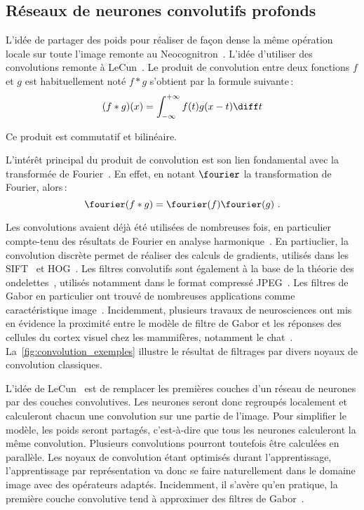\subsection{Réseaux de neurones convolutifs profonds}

L'idée de partager des poids pour réaliser de façon dense la même opération locale sur toute l'image remonte au Neocognitron~\cite{fukushima_neocognitron_1980}. L'idée d'utiliser des convolutions remonte à LeCun~\cite{lecun_gradient-based_1998}. Le produit de convolution entre deux fonctions $f$ et $g$ est habituellement noté $f * g$ s'obtient par la formule suivante\,:
$$(f * g)(x) = \int_{-\infty}^{+\infty} f(t)g(x-t)\diff t$$

Ce produit est commutatif et bilinéaire.

L'intérêt principal du produit de convolution est son lien fondamental avec la transformée de Fourier~\cite{fourier_propagation_1822}. En effet, en notant $\fourier$ la transformation de Fourier, alors\,:
$$\fourier(f \ast g) = \fourier (f)\fourier (g)~.$$


Les convolutions avaient déjà été utilisées de nombreuses fois, en particulier compte-tenu des résultats de Fourier en analyse harmonique~\cite{fourier_propagation_1822}. En partiuclier, la convolution discrète permet de réaliser des calculs de gradients, utilisés dans les \gls{SIFT}~\cite{lowe_object_1999} et \gls{HOG}~\cite{dalal_histograms_2005}. Les filtres convolutifs sont également à la base de la théorie des ondelettes~\cite{mallat_exploration_2001}, utilisés notamment dans le format compressé \gls{JPEG}~\cite{daubechies_ten_1992}. Les filtres de Gabor en particulier ont trouvé de nombreuses applications comme caractéristique image~\cite{pati_word_2008}. Incidemment, plusieurs travaux de neurosciences ont mis en évidence la proximité entre le modèle de filtre de Gabor et les réponses des cellules du cortex visuel chez les mammifères, notamment le chat~\cite{marcelja_mathematical_1980,jones_evaluation_1987}. La~\cref{fig:convolution_exemples} illustre le résultat de filtrages par divers noyaux de convolution classiques.

L'idée de LeCun~\cite{lecun_gradient-based_1998} est de remplacer les premières couches d'un réseau de neurones par des couches convolutives. Les neurones seront donc regroupés localement et calculeront chacun une convolution sur une partie de l'image. Pour simplifier le modèle, les poids seront partagés, c'est-à-dire que tous les neurones calculeront la même convolution. Plusieurs convolutions pourront toutefois être calculées en parallèle. Les noyaux de convolution étant optimisés durant l'apprentissage, l'apprentissage par représentation va donc se faire naturellement dans le domaine image avec des opérateurs adaptés. Incidemment, il s'avère qu'en pratique, la première couche convolutive tend à approximer des filtres de Gabor~\cite{yosinski_how_2014}.

